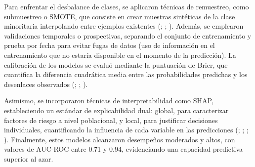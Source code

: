 Para enfrentar el desbalance de clases, se aplicaron técnicas de remuestreo, como submuestreo o SMOTE, que consiste en crear muestras sintéticas de la clase minoritaria interpolando entre ejemplos existentes (\cite{article4}; \cite{article6}; \cite{article16}). Además, se emplearon validaciones temporales o prospectivas, separando el conjunto de entrenamiento y prueba por fecha para evitar fugas de datos (uso de información en el entrenamiento que no estaría disponible en el momento de la predicción). La calibración de los modelos se evaluó mediante la puntuación de Brier, que cuantifica la diferencia cuadrática media entre las probabilidades predichas y los desenlaces observados (\cite{article1}; \cite{article8}; \cite{article9}).

Asimismo, se incorporaron técnicas de interpretabilidad como SHAP, estableciendo un estándar de explicabilidad dual: global, para caracterizar factores de riesgo a nivel poblacional, y local, para justificar decisiones individuales, cuantificando la influencia de cada variable en las predicciones (\cite{article1}; \cite{article4}; \cite{article7}; \cite{article11}). Finalmente, estos modelos alcanzaron desempeños moderados y altos, con valores de AUC-ROC entre 0.71 y 0.94, evidenciando una capacidad predictiva superior al azar.

